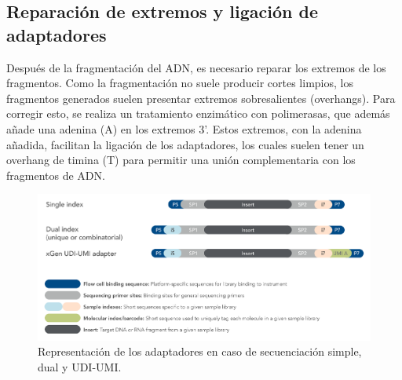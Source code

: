 \begin{itemize}
\begin{table}[htbp]
\centering
{}
\caption{Pros y contras de cada método de fragmentación por ligación}
\end{table}
\end{itemize}

\subsection{Reparación de extremos y ligación de adaptadores}
Después de la fragmentación del ADN, es necesario reparar los extremos de los fragmentos. Como la fragmentación no suele producir cortes limpios, los fragmentos generados suelen presentar extremos sobresalientes (overhangs). Para corregir esto, se realiza un tratamiento enzimático con polimerasas, que además añade una adenina (A) en los extremos 3’. Estos extremos, con la adenina añadida, facilitan la ligación de los adaptadores, los cuales suelen tener un overhang de timina (T) para permitir una unión complementaria con los fragmentos de ADN.

\begin{figure}[htbp]
\centering
\includegraphics[width = \textwidth]{figs/adaptator.png}
\caption{Representación de los adaptadores en caso de secuenciación simple, dual y UDI-UMI.}
\label{fig:umi}
\end{figure}

